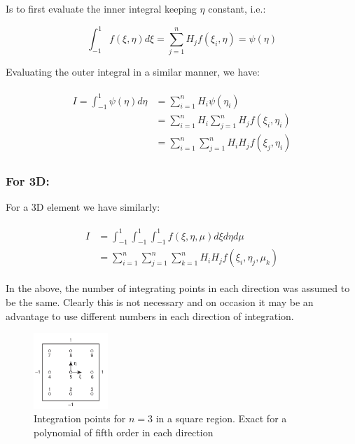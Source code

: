 \documentclass[10pt,b5paper,titlepage]{book}
\newenvironment{eqarray}
{
    \begin{eqnarray}
        \begin{aligned}
}
{
        \end{aligned}
    \end{eqnarray}
}
\begin{document}
Is to first evaluate the inner integral keeping $ \eta $ constant, i.e.:

\begin{equation}
    \int_{-1}^{1}f(\xi, \eta) d\xi = \sum_{j=1}^n H_j f(\xi_i, \eta) = \psi(\eta)
\end{equation}

Evaluating the outer integral in a similar manner, we have:

\begin{eqarray}
    I = \int_{-1}^{1} \psi(\eta) d\eta
    &= \sum_{i=1}^n H_i \psi(\eta_i)\\
    &= \sum_{i=1}^n H_i \sum_{j=1}^n H_j f(\xi_i,\eta_i)\\
    &= \sum_{i=1}^n \sum_{j=1}^n H_i H_j f(\xi_j,\eta_i)
\end{eqarray}

\subsubsection{For 3D:}
For a 3D element we have similarly:

\begin{eqarray}
    I &= \int_{-1}^{1} \int_{-1}^{1} \int_{-1}^{1} f(\xi, \eta, \mu) d\xi d\eta d\mu\\
    &= \sum_{i=1}^n \sum_{j=1}^n \sum_{k=1}^n H_i H_j f(\xi_i,\eta_j,\mu_k)
\end{eqarray}

In the above, the number of integrating points in each direction was assumed to be
the same. Clearly this is not necessary and on occasion it may be an advantage to
use different numbers in each direction of integration.

\begin{figure}[ht]
    \centering
    \includegraphics[width=0.25\textwidth]{img/quad_interpolation_3.png}
    \caption{Integration points for $ n = 3 $ in a square region. Exact for a
    polynomial of fifth order in each direction}
    \label{fig:quad-interpolation-3-png}
\end{figure}
\end{document}
